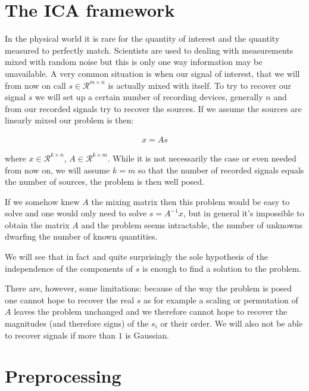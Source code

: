 \documentclass[a4paper,BCOR=5mm,oneside,openany]{scrreprt}
\begin{document}


\tableofcontents

\chapter{The ICA framework}

In the physical world it is rare for the quantity of interest and the quantity measured to perfectly match. Scientists are used to dealing with measurements mixed with random noise but this is only one way information may be unavailable.
A very common situation is when our signal of interest, that we will from now on call $s \in \mathcal{R}^{m \times n}$ is actually mixed with itself. To try to recover our signal $s$ we will set up a certain number of recording devices, generally $n$ and from our recorded signals try to recover the sources. If we assume the sources are linearly mixed our problem is then:

\begin{align*}
	x = A s
\end{align*}

where $x \in \mathcal{R}^{k \times n}$, $A \in \mathcal{R}^{k \times m}$. While it is not necessarily the case or even needed from now on, we will assume $k = m$ so that the number of recorded signals equals the number of sources, the problem is then well posed.

If we somehow knew $A$ the mixing matrix then this problem would be easy to solve and one would only need to solve $s = A^{-1} x$, but in general it's impossible to obtain the matrix $A$ and the problem seems intractable, the number of unknowns dwarfing the number of known quantities.

We will see that in fact and quite surprisingly the sole hypothesis of the independence of the components of $s$ is enough to find a solution to the problem. 

There are, however, some limitations: because of the way the problem is posed one cannot hope to recover the real $s$ as for example a scaling or permutation of $A$ leaves the problem unchanged and we therefore cannot hope to recover the magnitudes (and therefore signs) of the $s_i$ or their order. We will also not be able to recover signals if more than $1$ is Gaussian.

\chapter{Preprocessing}
\end{document}
